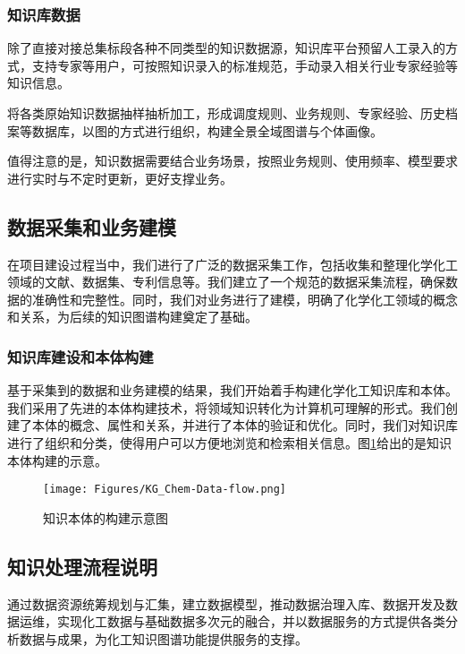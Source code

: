 \subsubsection{知识库数据} 
除了直接对接总集标段各种不同类型的知识数据源，知识库平台预留人工录入的方式，支持专家等用户，可按照知识录入的标准规范，手动录入相关行业专家经验等知识信息。

将各类原始知识数据抽样抽析加工，形成调度规则、业务规则、专家经验、历史档案等数据库，以图的方式进行组织，构建全景全域图谱与个体画像。

值得注意的是，知识数据需要结合业务场景，按照业务规则、使用频率、模型要求进行实时与不定时更新，更好支撑业务。

\subsection{数据采集和业务建模} 
在项目建设过程当中，我们进行了广泛的数据采集工作，包括收集和整理化学化工领域的文献、数据集、专利信息等。我们建立了一个规范的数据采集流程，确保数据的准确性和完整性。同时，我们对业务进行了建模，明确了化学化工领域的概念和关系，为后续的知识图谱构建奠定了基础。

\subsubsection{知识库建设和本体构建} 
基于采集到的数据和业务建模的结果，我们开始着手构建化学化工知识库和本体。我们采用了先进的本体构建技术，将领域知识转化为计算机可理解的形式。我们创建了本体的概念、属性和关系，并进行了本体的验证和优化。同时，我们对知识库进行了组织和分类，使得用户可以方便地浏览和检索相关信息。图\ref{Fig:KG-Chem_Data-flow}给出的是知识本体构建的示意。

\begin{figure}[h!]
\centering
\texttt{[image: Figures/KG\_Chem-Data-flow.png]}
\caption{\small\textrm{知识本体的构建示意图}}%
\label{Fig:KG-Chem_Data-flow}
\end{figure}
%
\subsection{知识处理流程说明} 
通过数据资源统筹规划与汇集，建立数据模型，推动数据治理入库、数据开发及数据运维，实现化工数据与基础数据多次元的融合，并以数据服务的方式提供各类分析数据与成果，为化工知识图谱功能提供服务的支撑。

